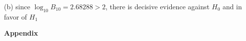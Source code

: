 \documentclass{homeworg}
\begin{document}
(b) since $\log_{10}B_{10}=2.68288>2$, there is decisive evidence against $H_0$ and in favor of $H_1$
%
%


%
%
\newpage
\textbf{Appendix}

\end{document}
